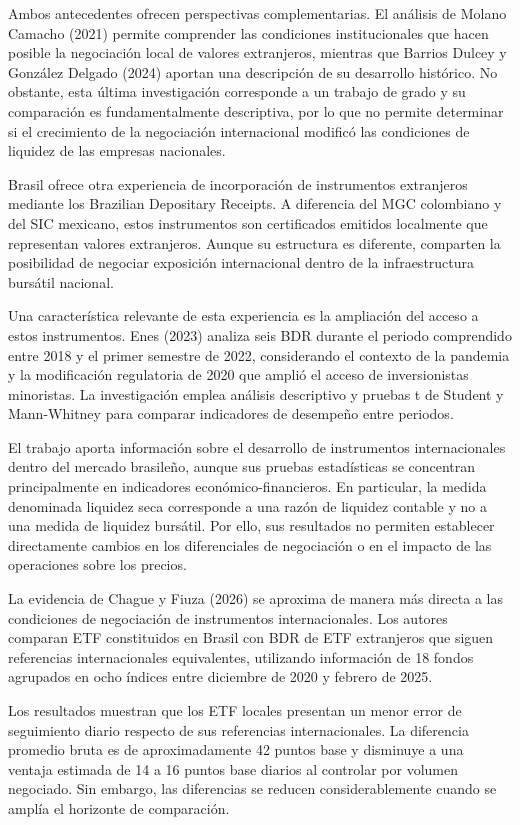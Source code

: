 Ambos antecedentes ofrecen perspectivas complementarias. El análisis de Molano Camacho (2021) permite comprender las condiciones institucionales que hacen posible la negociación local de valores extranjeros, mientras que Barrios Dulcey y González Delgado (2024) aportan una descripción de su desarrollo histórico. No obstante, esta última investigación corresponde a un trabajo de grado y su comparación es fundamentalmente descriptiva, por lo que no permite determinar si el crecimiento de la negociación internacional modificó las condiciones de liquidez de las empresas nacionales.

Brasil ofrece otra experiencia de incorporación de instrumentos extranjeros mediante los Brazilian Depositary Receipts. A diferencia del MGC colombiano y del SIC mexicano, estos instrumentos son certificados emitidos localmente que representan valores extranjeros. Aunque su estructura es diferente, comparten la posibilidad de negociar exposición internacional dentro de la infraestructura bursátil nacional.

Una característica relevante de esta experiencia es la ampliación del acceso a estos instrumentos. Enes (2023) analiza seis BDR durante el periodo comprendido entre 2018 y el primer semestre de 2022, considerando el contexto de la pandemia y la modificación regulatoria de 2020 que amplió el acceso de inversionistas minoristas. La investigación emplea análisis descriptivo y pruebas t de Student y Mann-Whitney para comparar indicadores de desempeño entre periodos.

El trabajo aporta información sobre el desarrollo de instrumentos internacionales dentro del mercado brasileño, aunque sus pruebas estadísticas se concentran principalmente en indicadores económico-financieros. En particular, la medida denominada liquidez seca corresponde a una razón de liquidez contable y no a una medida de liquidez bursátil. Por ello, sus resultados no permiten establecer directamente cambios en los diferenciales de negociación o en el impacto de las operaciones sobre los precios.

La evidencia de Chague y Fiuza (2026) se aproxima de manera más directa a las condiciones de negociación de instrumentos internacionales. Los autores comparan ETF constituidos en Brasil con BDR de ETF extranjeros que siguen referencias internacionales equivalentes, utilizando información de 18 fondos agrupados en ocho índices entre diciembre de 2020 y febrero de 2025.

Los resultados muestran que los ETF locales presentan un menor error de seguimiento diario respecto de sus referencias internacionales. La diferencia promedio bruta es de aproximadamente 42 puntos base y disminuye a una ventaja estimada de 14 a 16 puntos base diarios al controlar por volumen negociado. Sin embargo, las diferencias se reducen considerablemente cuando se amplía el horizonte de comparación.

